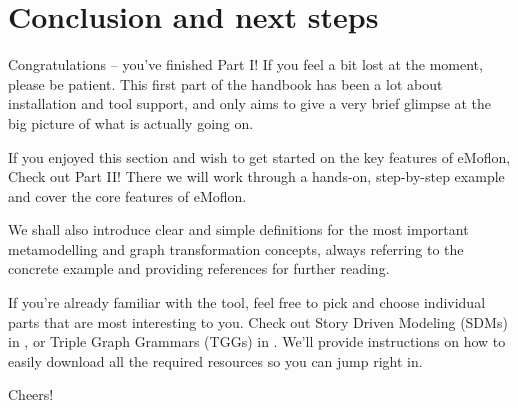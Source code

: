 \newpage
\hypertarget{conclusion}{} 
\chapter{Conclusion and next steps}
\genHeader

Congratulations -- you've finished Part I! If you feel a bit lost at the moment, please be patient. This first part of the handbook has been a lot about
installation and tool support, and only aims to give a very brief glimpse at the big picture of what is actually going on.

If you enjoyed this section and wish to get started on the key features of eMoflon, Check out Part II! There we will work through a hands-on, step-by-step
example and cover the core features of eMoflon.

We shall also introduce clear and simple definitions for the most important metamodelling and graph transformation concepts, always referring to the concrete
example and providing references for further reading.

If you're already familiar with the tool, feel free to pick and choose individual parts that are most interesting to you.
Check out Story Driven Modeling (SDMs) in , or Triple Graph Grammars (TGGs) in .
We'll provide instructions on how to easily download all the required resources so you can jump right in.


Cheers!